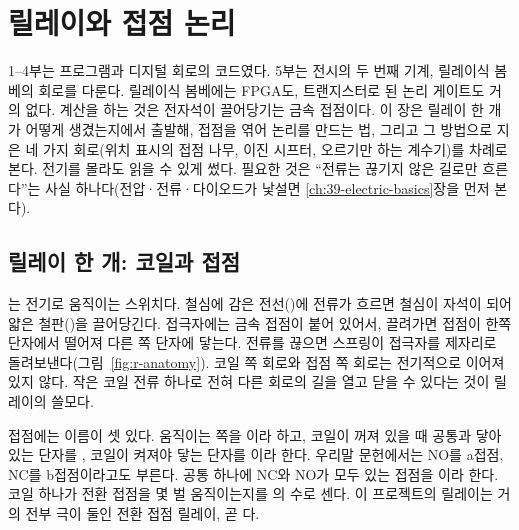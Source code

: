 \chapter{릴레이와 접점 논리}\label{ch:relay}

1--4부는 프로그램과 디지털 회로의 코드였다. 5부는 전시의 두 번째 기계, 릴레이식 봄베의 회로를 다룬다.
릴레이식 봄베에는 FPGA도, 트랜지스터로 된 논리 게이트도 거의 없다. 계산을 하는 것은 전자석이 끌어당기는
금속 접점이다. 이 장은 릴레이 한 개가 어떻게 생겼는지에서 출발해, 접점을 엮어 논리를 만드는 법, 그리고
그 방법으로 지은 네 가지 회로(위치 표시의 접점 나무, 이진 시프터, 오르기만 하는 계수기)를 차례로 본다.
전기를 몰라도 읽을 수 있게 썼다. 필요한 것은 ``전류는 끊기지 않은 길로만 흐른다''는 사실 하나다(전압·전류·다이오드가 낯설면
\ref{ch:39-electric-basics}장을 먼저 본다).

\section{릴레이 한 개: 코일과 접점}\label{sec:relay-one}

\Why {}는 전기로 움직이는 스위치다. 철심에 감은 전선()에 전류가 흐르면
철심이 자석이 되어 얇은 철판()을 끌어당긴다. 접극자에는 금속 접점이 붙어 있어서,
끌려가면 접점이 한쪽 단자에서 떨어져 다른 쪽 단자에 닿는다. 전류를 끊으면 스프링이 접극자를 제자리로
돌려보낸다(그림~\ref{fig:r-anatomy}). 코일 쪽 회로와 접점 쪽 회로는 전기적으로 이어져 있지 않다. 작은 코일
전류 하나로 전혀 다른 회로의 길을 열고 닫을 수 있다는 것이 릴레이의 쓸모다.

접점에는 이름이 셋 있다. 움직이는 쪽을 이라 하고, 코일이 꺼져 있을 때 공통과 닿아 있는
단자를 , 코일이 켜져야 닿는 단자를 이라
한다. 우리말 문헌에서는 NO를 a접점, NC를 b접점이라고도 부른다. 공통 하나에 NC와 NO가 모두 있는 접점을
이라 한다. 코일 하나가 전환 접점을 몇 벌 움직이는지를 의
수로 센다. 이 프로젝트의 릴레이는 거의 전부 극이 둘인 전환 접점 릴레이, 곧 다.

